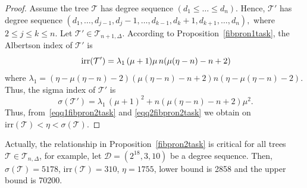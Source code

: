 \documentclass[12pt, a4paper]{article}
\newcommand{\TT}{\mathcal{T}}
\newcommand{\irr}{\mathrm{irr}}
\begin{document}
\begin{proof}
Assume the tree $\TT$ has degree sequence $(d_1 \leqslant \dots \leqslant d_n)$. Hence, $\TT'$ has degree sequence $(d_1, \dots, d_{j-1}, d_j-1, \dots, d_{k-1}, d_k+1, d_{k+1}, \dots, d_n),$ where $2\leqslant j\leqslant k \leqslant n$. Let $\TT' \in \TT_{n+1,\Delta}$. According to Proposition~\ref{fibpron1task}, the Albertson index of $\TT'$ is 
\begin{equation}~\label{eqq1fibpron2task}
\irr(\TT')=\lambda_1\,(\mu+1)\mu\,n(\mu(\eta-n)-n+2) \\
\end{equation}
where $\lambda_1=(\eta-\mu(\eta-n)-2)(\mu(\eta-n)-n+2)n(\eta-\mu(\eta-n)-2)$. 
Thus, the sigma index of $\TT'$ is
\begin{equation}~\label{eqq2fibpron2task}
   \sigma(\TT')=\lambda_1\,(\mu+1)^2+n(\mu(\eta-n)-n+2)\mu^2. 
\end{equation}
Thus, from~\eqref{eqq1fibpron2task} and \eqref{eqq2fibpron2task} we obtain on $\irr(\TT)<\eta<\sigma(\TT)$.
\end{proof}
Actually, the relationship in Proposition~\ref{fibpron2task} is critical for all trees $\TT \in \TT_{n,\Delta}$, for example, let $\mathscr{D}=(2^{18},3,10)$ be a degree sequence. Then,  $\sigma(\TT)=5178$, $\irr(\TT)=310$, $\eta=1755$, lower bound is 2858 and the upper bound is 70200.
\end{document}
